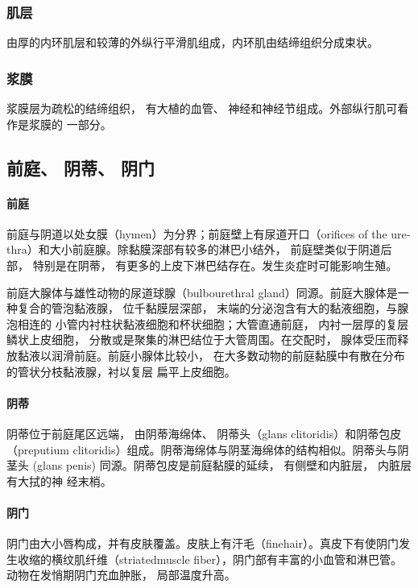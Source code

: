 \subsubsection{肌层}

由厚的内环肌层和较薄的外纵行平滑肌组成，内环肌由结缔组织分成束状。

\subsubsection{浆膜}

浆膜层为疏松的结缔组织， 有大植的血管、 神经和神经节组成。外部纵行肌可看作是浆膜的 一部分。

\subsection{前庭、 阴蒂、 阴门}

\paragraph{前庭}

前庭与阴道以处女膜（hymen）为分界；前庭壁上有尿道开口（orifices of the ure­thra）和大小前庭腺。除黏膜深部有较多的淋巴小结外， 前庭壁类似于阴道后部， 特别是在阴蒂， 有更多的上皮下淋巴结存在。发生炎症时可能影响生殖。

前庭大腺体与雄性动物的尿道球腺（bulbourethral gland）同源。前庭大腺体是一种复合的管泡黏液腺， 位千黏膜层深部， 末端的分泌泡含有大的黏液细胞，与腺泡相连的 小管内衬柱状黏液细胞和杯状细胞；大管直通前庭， 内衬一层厚的复层鳞状上皮细胞， 分散或是聚集的淋巴结位于大管周围。在交配时， 腺体受压而释放黏液以润滑前庭。前庭小腺体比较小， 在大多数动物的前庭黏膜中有散在分布的管状分枝黏液腺，衬以复层 扁平上皮细胞。

\paragraph{阴蒂}
阴蒂位于前庭尾区远端， 由阴蒂海绵体、 阴蒂头（glans clitoridis）和阴蒂包皮（preputium clitoridis）组成。阴蒂海绵体与阴茎海绵体的结构相似。阴蒂头与阴茎头 (glans penis) 同源。阴蒂包皮是前庭黏膜的延续， 有侧壁和内脏层， 内脏层有大拭的神 经末梢。

\paragraph{阴门}

阴门由大小唇构成，并有皮肤覆盖。皮肤上有汗毛（finehair）。真皮下有使阴门发生收缩的横纹肌纤维（striatedmuscle fiber），阴门部有丰富的小血管和淋巴管。动物在发悄期阴门充血肿胀， 局部温度升高。


